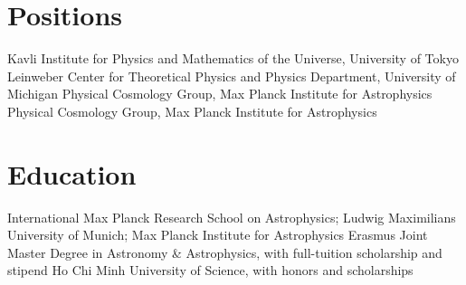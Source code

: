 \section*{Positions}
  {Kavli Institute for Physics and Mathematics of the Universe, University of Tokyo}{}
  {Leinweber Center for Theoretical Physics and Physics Department, University of Michigan}{}
  {Physical Cosmology Group, Max Planck Institute for Astrophysics}{}
  {Physical Cosmology Group, Max Planck Institute for Astrophysics}{}

\section*{Education}
  {International Max Planck Research School on Astrophysics; Ludwig Maximilians University of Munich; Max Planck Institute for Astrophysics}{}
  {Erasmus Joint Master Degree in Astronomy \& Astrophysics, with full-tuition scholarship and stipend}{}
  {Ho Chi Minh University of Science, with honors and scholarships}{}

